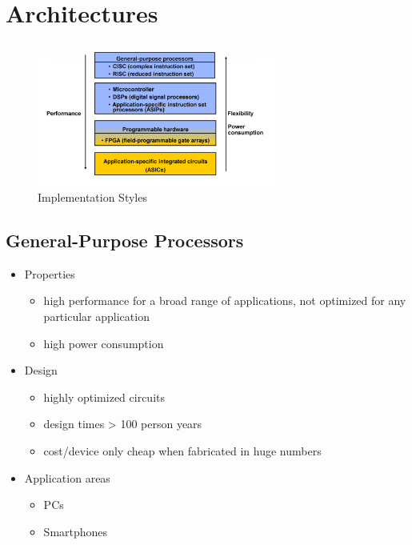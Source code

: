 \section{Architectures}

\begin{figure}
	\begin{center}
		\includegraphics[width=0.7\textwidth]{images/Implementaion_styles.png}
		\caption{Implementation Styles}
		\label{fig:Imp_Sty}
	\end{center}
\end{figure}

\subsection{General-Purpose Processors}
\begin{itemize}
	\item Properties
		\begin{itemize}
			\item high performance for a broad range of applications, not optimized for any particular application
			\item high power consumption
		\end{itemize}
	\item Design
		\begin{itemize}
			\item highly optimized circuits
			\item design times > 100 person years
			\item cost/device only cheap when fabricated in huge numbers 
		\end{itemize}
	\item Application areas
		\begin{itemize}
			\item PCs
			\item Smartphones
		\end{itemize}
\end{itemize}


